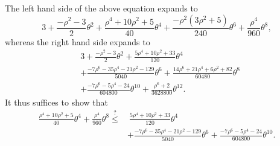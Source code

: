 \documentclass[letterpaper,onecolumn,11pt,accepted=2026-02-14]{quantumarticle}
\theoremstyle{remark}
\theoremstyle{plain}
\begin{document}
    The left hand side of the above equation expands to
    \begin{equation}
        3
        +\frac{-\rho^2-3}{2}\theta^2
        +\frac{\rho^4+10\rho^2+5}{40}\theta^4
        +\frac{-\rho^2(3\rho^2+5)}{240}\theta^6
        +\frac{\rho^4}{960}\theta^8,
    \end{equation}
    whereas the right hand side expands to
    \begin{equation}
    \begin{aligned}
        &3+\frac{-\rho^2-3}{2}\theta^2
        +\frac{5\rho^4+10\rho^2+33}{120}\theta^4\\
        &+\frac{-7\rho^6-35\rho^4-21\rho^2-129}{5040}\theta^6
        +\frac{14\rho^6+21\rho^4+6\rho^2+82}{60480}\theta^8\\
        &+\frac{-7\rho^6-5\rho^4-24}{604800}\theta^{10}
        +\frac{\rho^6+2}{3628800}\theta^{12}.
    \end{aligned}
    \end{equation}
    It thus suffices to show that
    \begin{equation}
    \label{eq:vtaa_taylor_ineq}
    \begin{aligned}
        \frac{\rho^4+10\rho^2+5}{40}\theta^4
        +\frac{\rho^4}{960}\theta^8
        \overset{?}{\leq}&\ \frac{5\rho^4+10\rho^2+33}{120}\theta^4\\
        &+\frac{-7\rho^6-35\rho^4-21\rho^2-129}{5040}\theta^6
        +\frac{-7\rho^6-5\rho^4-24}{604800}\theta^{10}.
    \end{aligned}
    \end{equation}
    
\end{document}
